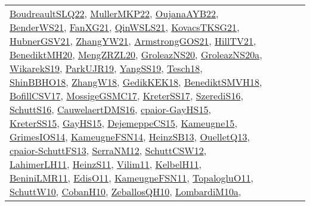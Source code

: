 {\begin{longtable}{lp{3cm}>{\raggedright}p{6cm}>{\raggedright}p{6cm}p{8cm}}
\href{papers/BoudreaultSLQ22.pdf}{BoudreaultSLQ22}\cite{BoudreaultSLQ22}, \href{articles/MullerMKP22.pdf}{MullerMKP22}\cite{MullerMKP22}, \href{papers/OujanaAYB22.pdf}{OujanaAYB22}\cite{OujanaAYB22}, \href{papers/BenderWS21.pdf}{BenderWS21}\cite{BenderWS21}, \href{articles/FanXG21.pdf}{FanXG21}\cite{FanXG21}, \href{articles/QinWSLS21.pdf}{QinWSLS21}\cite{QinWSLS21}, \href{papers/KovacsTKSG21.pdf}{KovacsTKSG21}\cite{KovacsTKSG21}, \href{articles/HubnerGSV21.pdf}{HubnerGSV21}\cite{HubnerGSV21}, \href{articles/ZhangYW21.pdf}{ZhangYW21}\cite{ZhangYW21}, \href{papers/ArmstrongGOS21.pdf}{ArmstrongGOS21}\cite{ArmstrongGOS21}, \href{papers/HillTV21.pdf}{HillTV21}\cite{HillTV21}, \href{articles/BenediktMH20.pdf}{BenediktMH20}\cite{BenediktMH20}, \href{articles/MengZRZL20.pdf}{MengZRZL20}\cite{MengZRZL20}, \href{papers/GroleazNS20.pdf}{GroleazNS20}\cite{GroleazNS20}, \href{papers/GroleazNS20a.pdf}{GroleazNS20a}\cite{GroleazNS20a}, \href{articles/WikarekS19.pdf}{WikarekS19}\cite{WikarekS19}, \href{papers/ParkUJR19.pdf}{ParkUJR19}\cite{ParkUJR19}, \href{papers/YangSS19.pdf}{YangSS19}\cite{YangSS19}, \href{papers/Tesch18.pdf}{Tesch18}\cite{Tesch18}, \href{articles/ShinBBHO18.pdf}{ShinBBHO18}\cite{ShinBBHO18}, \href{articles/ZhangW18.pdf}{ZhangW18}\cite{ZhangW18}, \href{articles/GedikKEK18.pdf}{GedikKEK18}\cite{GedikKEK18}, \href{papers/BenediktSMVH18.pdf}{BenediktSMVH18}\cite{BenediktSMVH18}, \href{papers/BofillCSV17.pdf}{BofillCSV17}\cite{BofillCSV17}, \href{papers/MossigeGSMC17.pdf}{MossigeGSMC17}\cite{MossigeGSMC17}, \href{articles/KreterSS17.pdf}{KreterSS17}\cite{KreterSS17}, \href{papers/SzerediS16.pdf}{SzerediS16}\cite{SzerediS16}, \href{papers/SchuttS16.pdf}{SchuttS16}\cite{SchuttS16}, \href{papers/CauwelaertDMS16.pdf}{CauwelaertDMS16}\cite{CauwelaertDMS16}, \href{papers/cpaior-GayHS15.pdf}{cpaior-GayHS15}\cite{cpaior-GayHS15}, \href{papers/KreterSS15.pdf}{KreterSS15}\cite{KreterSS15}, \href{papers/GayHS15.pdf}{GayHS15}\cite{GayHS15}, \href{papers/DejemeppeCS15.pdf}{DejemeppeCS15}\cite{DejemeppeCS15}, \href{articles/Kameugne15.pdf}{Kameugne15}\cite{Kameugne15}, \href{articles/GrimesIOS14.pdf}{GrimesIOS14}\cite{GrimesIOS14}, \href{articles/KameugneFSN14.pdf}{KameugneFSN14}\cite{KameugneFSN14}, \href{articles/HeinzSB13.pdf}{HeinzSB13}\cite{HeinzSB13}, \href{papers/OuelletQ13.pdf}{OuelletQ13}\cite{OuelletQ13}, \href{papers/cpaior-SchuttFS13.pdf}{cpaior-SchuttFS13}\cite{cpaior-SchuttFS13}, \href{papers/SerraNM12.pdf}{SerraNM12}\cite{SerraNM12}, \href{papers/SchuttCSW12.pdf}{SchuttCSW12}\cite{SchuttCSW12}, \href{papers/LahimerLH11.pdf}{LahimerLH11}\cite{LahimerLH11}, \href{papers/HeinzS11.pdf}{HeinzS11}\cite{HeinzS11}, \href{papers/Vilim11.pdf}{Vilim11}\cite{Vilim11}, \href{articles/KelbelH11.pdf}{KelbelH11}\cite{KelbelH11}, \href{articles/BeniniLMR11.pdf}{BeniniLMR11}\cite{BeniniLMR11}, \href{papers/EdisO11.pdf}{EdisO11}\cite{EdisO11}, \href{papers/KameugneFSN11.pdf}{KameugneFSN11}\cite{KameugneFSN11}, \href{articles/TopalogluO11.pdf}{TopalogluO11}\cite{TopalogluO11}, \href{papers/SchuttW10.pdf}{SchuttW10}\cite{SchuttW10}, \href{papers/CobanH10.pdf}{CobanH10}\cite{CobanH10}, \href{articles/ZeballosQH10.pdf}{ZeballosQH10}\cite{ZeballosQH10}, \href{articles/LombardiM10a.pdf}{LombardiM10a}\cite{LombardiM10a}, 
\end{longtable}}
